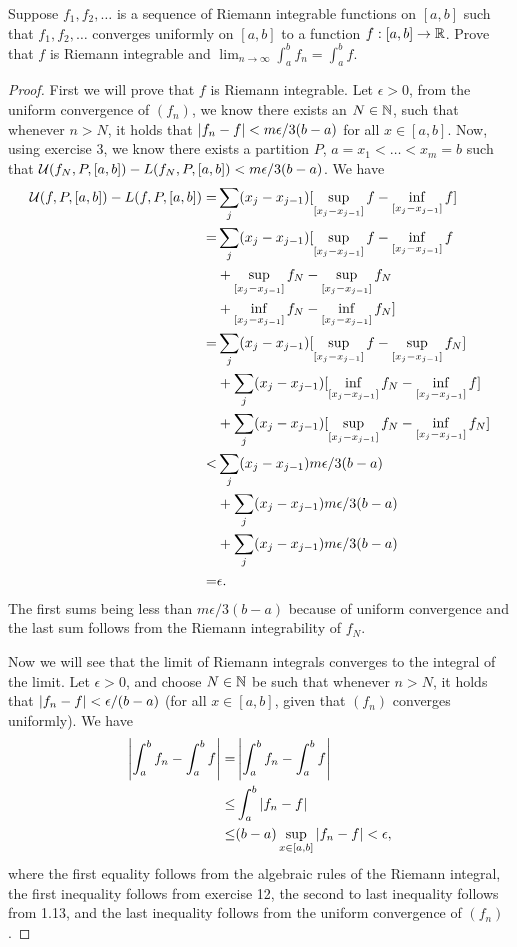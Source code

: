 \begin{exercise}{14}
Suppose $f_1, f_2,\dots$ is a sequence of Riemann integrable functions on $[a,b]$ such that $f_1,f_2,\dots$ converges uniformly on $[a,b]$ to a function $f:[a,b]\to\mathbb{R}$.
Prove that $f$ is Riemann integrable and $\lim_{n\to\infty}\int_a^b f_n = \int_a^b f$.
\end{exercise}
\begin{proof}
First we will prove that $f$ is Riemann integrable.
Let $\epsilon>0$, from the uniform convergence of $(f_n)$, we know there exists an $N\in\mathbb{N}$, such that whenever $n>N$, it holds that $\left\lvert f_n-f\right\rvert<m\epsilon/3(b-a)$ for all $x\in [a,b]$.
Now, using exercise 3, we know there exists a partition $P$, $a=x_1<\dots<x_m=b$ such that $\mathcal{U}(f_N,P,[a,b])-L(f_N,P,[a,b])<m\epsilon/3(b-a)$.
We have
\begin{align*}
    \mathcal{U}(f,P,[a,b]) - L(f,P,[a,b])
    =&  \sum_j (x_j-x_{j-1})[\sup_{[x_j-x_{j-1}]} f - \inf_{[x_j-x_{j-1}]}f]\\
    =&  \sum_j (x_j-x_{j-1})
    [\sup_{[x_j-x_{j-1}]} f - \inf_{[x_j-x_{j-1}]}f\\
    &+ \sup_{[x_j-x_{j-1}]} f_N - \sup_{[x_j-x_{j-1}]}f_N\\
    &+ \inf_{[x_j-x_{j-1}]} f_N - \inf_{[x_j-x_{j-1}]}f_N]\\
    =&  \sum_j (x_j-x_{j-1})
    [\sup_{[x_j-x_{j-1}]} f - \sup_{[x_j-x_{j-1}]}f_N] \\
    &+ \sum_j (x_j-x_{j-1}) 
    [\inf_{[x_j-x_{j-1}]} f_N - \inf_{[x_j-x_{j-1}]}f] \\
    &+ \sum_j (x_j-x_{j-1})
    [\sup_{[x_j-x_{j-1}]} f_N - \inf_{[x_j-x_{j-1}]}f_N]\\
    <& \sum_j (x_j-x_{j-1}) m\epsilon/3(b-a)\\
    &+ \sum_j (x_j-x_{j-1}) m\epsilon/3(b-a)\\
    &+ \sum_j (x_j-x_{j-1}) m\epsilon/3(b-a)\\
    =& \epsilon.
\end{align*}
The first sums being less than $m\epsilon/3(b-a)$ because of uniform convergence and the last sum follows from the Riemann integrability of $f_N$.

Now we will see that the limit of Riemann integrals converges to the integral of the limit.
Let $\epsilon>0$, and choose $N\in\mathbb{N}$ be such that whenever $n>N$, it holds that $\left\lvert f_n - f\right\rvert < \epsilon/(b-a)$ (for all $x\in[a,b]$, given that $(f_n)$ converges uniformly).
We have
\begin{align*}
    \left\lvert \int_a^b f_n - \int_a^b f\right\rvert
    =& \left\lvert \int_a^b f_n - \int_a^b f\right\rvert\\
    \leq& \int_a^b \left\lvert f_n - f\right\rvert\\
    \leq& (b-a)\sup_{x\in[a,b]}\left\lvert f_n - f\right\rvert 
    < \epsilon,
\end{align*}
where the first equality follows from the algebraic rules of the Riemann integral, the first inequality follows from exercise 12, the second to last inequality follows from 1.13, and the last inequality follows from the uniform convergence of $(f_n)$.
\end{proof} 
